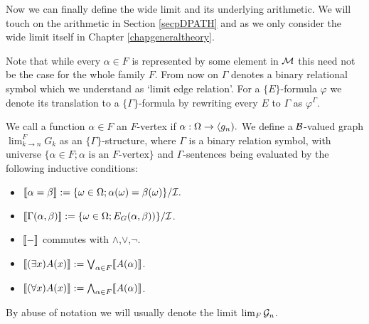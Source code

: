 Now we can finally define the wide limit and its underlying arithmetic. We will touch on the arithmetic in Section \ref{secpDPATH} and as we only consider the wide limit itself in Chapter \ref{chapgeneraltheory}.

Note that while every $\alpha\in F$ is represented by some element in $\mathcal{M}$ this need not be the case for the whole family $F$. From now on $\Gamma$ denotes a binary relational symbol which we understand as `limit edge relation'. For a $\{E\}$-formula $\varphi$ we denote its translation to a $\{\Gamma\}$-formula by rewriting every $E$ to $\Gamma$ as $\varphi^{\Gamma}$.

\begin{defi}
We call a function $\alpha\in F$ an $F$-vertex if ${\alpha:\Omega\to\langle g_n)}.$ We define a $\mathcal{B}$-valued graph $\lim_{k\to n}^{F}G_k$ as an $\{\Gamma\}$-structure, where $\Gamma$ is a binary relation symbol, with universe $\{\alpha\in F; \alpha\text{ is an $F$-vertex}\}$ and $\Gamma$-sentences being evaluated by the following inductive conditions:
\begin{itemize}
\item $\llbracket \alpha=\beta \rrbracket := \{\omega\in\Omega; \alpha(\omega)=\beta(\omega)\}/\mathcal{I}.$
\item $\llbracket \Gamma(\alpha,\beta) \rrbracket := \{\omega\in\Omega; E_G(\alpha,\beta))\}/\mathcal{I}$.
\item $\llbracket-\rrbracket$ commutes with $\land$,$\lor$,$\lnot$.
\item $\llbracket(\exists x)A(x)\rrbracket:=\bigvee_{\alpha\in F}\llbracket A(\alpha)\rrbracket$.
\item $\llbracket(\forall x)A(x)\rrbracket:=\bigwedge_{\alpha\in F}\llbracket A(\alpha)\rrbracket$.
\end{itemize}

By abuse of notation we will usually denote the limit $\lim_{F}\mathcal{G}_n$.
\end{defi}

